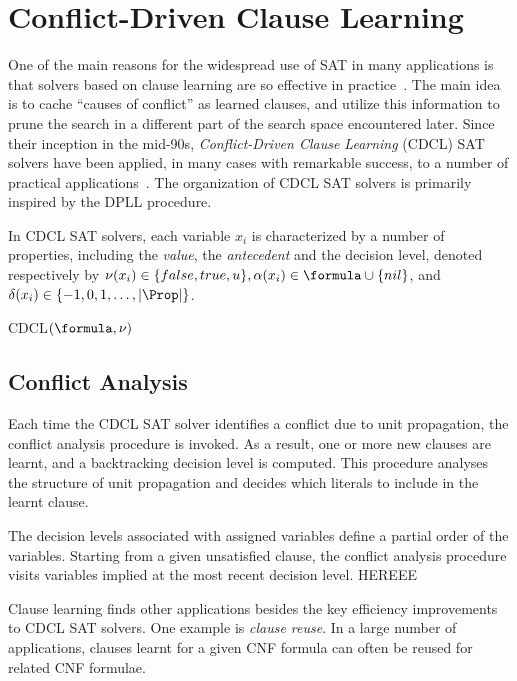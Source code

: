 \section{Conflict-Driven Clause Learning}
\label{sec:cdcl}

One of the main reasons for the widespread use of SAT in many applications is
that solvers based on clause learning are so effective in
practice~\cite{satchapter}. The main idea is to cache ``causes of conflict'' as
learned clauses, and utilize this information to prune the search in a different
part of the search space encountered later. Since their inception in the
mid-90s, \emph{Conflict-Driven Clause Learning} (CDCL) SAT solvers have been
applied, in many cases with remarkable success, to a number of practical
applications~\cite{cdclchapter}. The organization of CDCL SAT solvers is
primarily inspired by the DPLL procedure.

In CDCL SAT solvers, each variable $x_i$ is characterized by a number of
properties, including the \emph{value}, the \emph{antecedent} and the
decision level, denoted respectively by $\nu(x_i) \in \{false, true, u\},
\alpha(x_i) \in \formula \cup \{nil\}$, and $\delta(x_i) \in \{-1, 0, 1, \ldots,
|\Prop|\}$.
 

\begin{algorithm}[!ht]
    \caption{CDCL$(\formula, \nu)$}
\label{alg:cdcl}
\end{algorithm}

\subsection{Conflict Analysis}

Each time the CDCL SAT solver identifies a conflict due to unit propagation, the
conflict analysis procedure is invoked. As a result, one or more new clauses are
learnt, and a backtracking decision level is computed. This procedure analyses
the structure of unit propagation and decides which literals to include in the
learnt clause.

The decision levels associated with assigned variables define a partial order of
the variables. Starting from a given unsatisfied clause, the conflict analysis
procedure visits variables implied at the most recent decision level. HEREEE 

Clause learning finds other applications besides the key efficiency improvements
to CDCL SAT solvers. One example is \emph{clause reuse}. In a large number of
applications, clauses learnt for a given CNF formula can often be reused for
related CNF formulae. 

